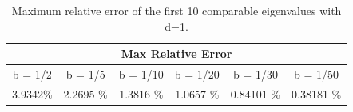 \documentclass[../../main.tex]{subfiles}
\begin{document}
\FloatBarrier
\begin{table}[htbp]
	\centering
	\caption{Maximum relative error of the first 10 comparable eigenvalues with d=1.}
	\begin{tabular}{|c|c|c|c|c|c|}
		\hline
		\multicolumn{6}{|c|}{Max Relative Error } \\ 
		\hline 
		\hline
		b = 1/2 & b = 1/5 & b = 1/10 & b = 1/20 & b = 1/30 & b = 1/50\\ \hline
		3.9342\% & 2.2695 \% & 1.3816 \% & 1.0657 \% & 0.84101 \% & 0.38181 \% \\ \hline
	\end{tabular}%
	\label{tab:addlabel}%
\end{table}%
\end{document}
